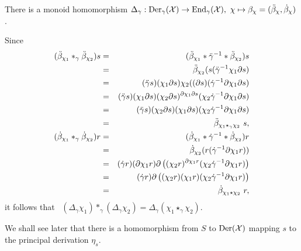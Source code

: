 \newpage
\begin{thm} \label{thm:Delta}
There is a monoid homomorphism 
$\Delta_{\gamma} : \mathrm{Der}_{\gamma}(\mathcal{X}) \to \mathrm{End}_{\gamma}(\mathcal{X}),~ 
                   \chi \mapsto \beta_{\chi} = (\ddot{\beta}_{\chi},\dot{\beta}_{\chi})$.
\end{thm}
\begin{pf}
Since 
\vspace*{-9mm} 
\begin{eqnarray*}
(\ddot{\beta}_{\chi_1} \ast_{\gamma} \ddot{\beta}_{\chi_2})s 
 &=& (\ddot{\beta}_{\chi_1} * \ddot{\gamma}^{-1} * \ddot{\beta}_{\chi_2})s \\ 
 &=& \ddot{\beta}_{\chi_2}(s(\ddot{\gamma}^{-1}\chi_1\partial s)  \\ 
 &=& (\ddot{\gamma} s)(\chi_1\partial s)\chi_2((\partial s)
       (\dot{\gamma}^{-1}\partial\chi_1\partial s) \\ 
 &=& (\ddot{\gamma} s)(\chi_1\partial s)(\chi_2\partial s)^{\partial\chi_1\partial s} 
       (\chi_2\dot{\gamma}^{-1}\partial\chi_1\partial s) \\ 
 &=& (\ddot{\gamma} s)(\chi_2\partial s)(\chi_1\partial s)
       (\chi_2\dot{\gamma}^{-1}\partial\chi_1\partial s) \\ 
 &=& \ddot{\beta}_{\chi_1 \star_{\gamma} \chi_2}\ s, \\
(\dot{\beta}_{\chi_1} \ast_{\gamma} \dot{\beta}_{\chi_2})r 
 &=& (\dot{\beta}_{\chi_1} * \dot{\gamma}^{-1} * \dot{\beta}_{\chi_2})r \\ 
 &=& \dot{\beta}_{\chi_2}(r(\dot{\gamma}^{-1}\partial\chi_1 r)) \\
 &=& (\dot{\gamma} r)(\partial\chi_1 r)\partial\left( 
       (\chi_2 r)^{\partial\chi_1r}(\chi_2\dot{\gamma}^{-1}\partial\chi_1 r)\right) \\ 
 &=& (\dot{\gamma} r)\partial\left( 
       (\chi_2r)(\chi_1r)(\chi_2\dot{\gamma}^{-1}\partial\chi_1 r)\right) \\
 &=& \dot{\beta}_{\chi_1\star\chi_2}\ r, 
\end{eqnarray*}
it follows that~ 
$(\Delta_{\gamma}\chi_1) \ast_{\gamma} (\Delta_{\gamma}\chi_2) 
 = \Delta_{\gamma}(\chi_1 \star_{\gamma} \chi_2)$.
\end{pf}


\medskip
We shall see later that there is a homomorphism from $S$ to $\mathrm{Der}(\mathcal{X})$ 
mapping $s$ to the principal derivation $\eta_s$. 

